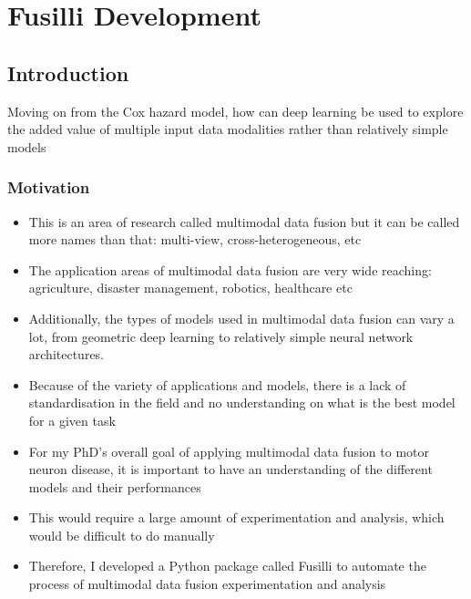 \chapter{Fusilli Development}
\label{fusilli_development}

\section{Introduction}
Moving on from the Cox hazard model, how can deep learning be used to explore the added value of multiple input data modalities rather than relatively simple models

\subsection{Motivation}
\begin{itemize}
    \item This is an area of research called multimodal data fusion but it can be called more names than that: multi-view, cross-heterogeneous, etc
    \item The application areas of multimodal data fusion are very wide reaching: agriculture, disaster management, robotics, healthcare etc
    \item Additionally, the types of models used in multimodal data fusion can vary a lot, from geometric deep learning to relatively simple neural network architectures.
    \item Because of the variety of applications and models, there is a lack of standardisation in the field and no understanding on what is the best model for a given task
    \item For my PhD's overall goal of applying multimodal data fusion to motor neuron disease, it is important to have an understanding of the different models and their performances
    \item This would require a large amount of experimentation and analysis, which would be difficult to do manually
    \item Therefore, I developed a Python package called Fusilli to automate the process of multimodal data fusion experimentation and analysis
\end{itemize}

